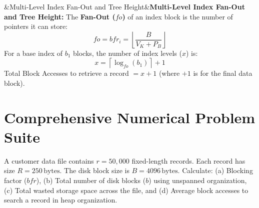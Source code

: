 \documentclass[11pt,a4paper]{article}
\newenvironment{Def}[1][]{\begin{tcolorbox}[defbox]\ifx&#1&\else\textbf{\color{AnthOrange}#1:}\enspace\fi}{\end{tcolorbox}}
\newenvironment{Problem}[1][Problem Scenario]{\begin{tcolorbox}[problembox, title=#1]}{\end{tcolorbox}}
\begin{document}
\begin{Def}[Multi-Level Index Fan-Out and Tree Height]
The \textbf{Fan-Out ($fo$)} of an index block is the number of pointers it can store:
\begin{equation}
  fo = bfr_i = \left\lfloor \frac{B}{V_K + P_B} \right\rfloor
\end{equation}
For a base index of $b_1$ blocks, the number of index levels ($x$) is:
\begin{equation}
  x = \left\lceil \log_{fo}(b_1) \right\rceil + 1
\end{equation}
Total Block Accesses to retrieve a record $= x + 1$ (where $+1$ is for the final data block).
\end{Def}

\clearpage
\section{Comprehensive Numerical Problem Suite}

\begin{Problem}[Problem 1: Blocking Factor and File Storage Size]
A customer data file contains $r = 50,000$ fixed-length records. Each record has size $R = 250\,\text{bytes}$. The disk block size is $B = 4096\,\text{bytes}$. Calculate: (a) Blocking factor ($bfr$), (b) Total number of disk blocks ($b$) using unspanned organization, (c) Total wasted storage space across the file, and (d) Average block accesses to search a record in heap organization.
\end{Problem}
\end{document}
